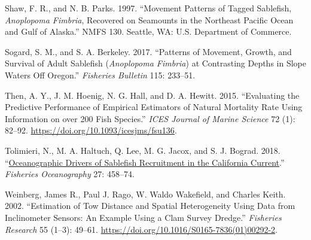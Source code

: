 \documentclass[
]{scrartcl}
\newlength{\cslhangindent}
\newenvironment{CSLReferences}[2] %
 {\begin{list}{}{%
  \setlength{\itemindent}{0pt}
  \setlength{\leftmargin}{0pt}
  \setlength{\parsep}{0pt}
  \ifodd #1
   \setlength{\leftmargin}{\cslhangindent}
   \setlength{\itemindent}{-1\cslhangindent}
  \fi
  \setlength{\itemsep}{#2\baselineskip}}}
 {\end{list}}
\begin{document}
\begin{CSLReferences}{1}{0}
Shaw, F. R., and N. B. Parks. 1997. {``Movement Patterns of Tagged
Sablefish, \emph{{A}noplopoma Fimbria}, Recovered on Seamounts in the
{N}ortheast {P}acific {O}cean and {G}ulf of {A}laska.''} NMFS 130.
Seattle, WA: {U}.{S}. Department of Commerce.

Sogard, S. M., and S. A. Berkeley. 2017. {``Patterns of Movement,
Growth, and Survival of Adult Sablefish (\emph{{A}noplopoma Fimbria}) at
Contrasting Depths in Slope Waters Off {O}regon.''} \emph{Fisheries
Bulletin} 115: 233--51.

Then, A. Y., J. M. Hoenig, N. G. Hall, and D. A. Hewitt. 2015.
{``Evaluating the Predictive Performance of Empirical Estimators of
Natural Mortality Rate Using Information on over 200 Fish Species.''}
\emph{ICES Journal of Marine Science} 72 (1): 82--92.
\url{https://doi.org/10.1093/icesjms/fsu136}.

Tolimieri, N., M. A. Haltuch, Q. Lee, M. G. Jacox, and S. J. Bograd.
2018. {``\href{}{Oceanographic Drivers of Sablefish Recruitment in the
{C}alifornia {C}urrent}.''} \emph{Fisheries Oceanography} 27: 458--74.

Weinberg, James R., Paul J. Rago, W. Waldo Wakefield, and Charles Keith.
2002. {``Estimation of Tow Distance and Spatial Heterogeneity Using Data
from Inclinometer Sensors: An Example Using a Clam Survey Dredge.''}
\emph{Fisheries Research} 55 (1--3): 49--61.
\url{https://doi.org/10.1016/S0165-7836(01)00292-2}.

\end{CSLReferences}
\end{document}
